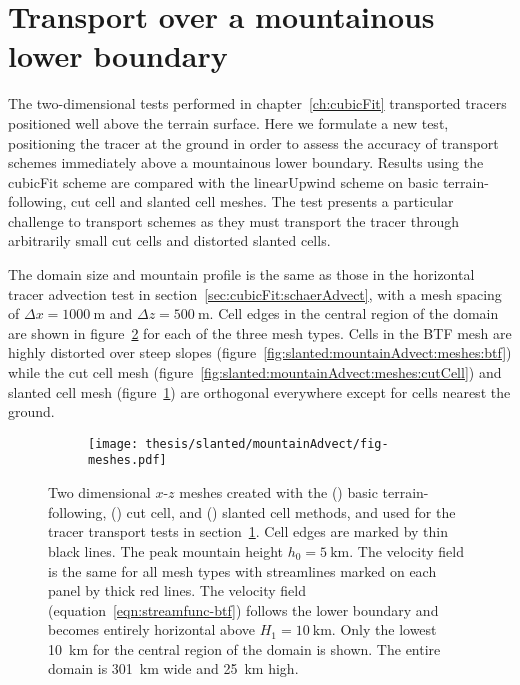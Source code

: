 \section{Transport over a mountainous lower boundary}
\label{sec:slanted:mountainAdvect}

The two-dimensional tests performed in chapter~\ref{ch:cubicFit} transported tracers positioned well above the terrain surface.  Here we formulate a new test, positioning the tracer at the ground in order to assess the accuracy of transport schemes immediately above a mountainous lower boundary.  Results using the cubicFit scheme are compared with the linearUpwind scheme on basic terrain-following, cut cell and slanted cell meshes.
The test presents a particular challenge to transport schemes as they must transport the tracer through arbitrarily small cut cells and distorted slanted cells.

The domain size and mountain profile is the same as those in the horizontal tracer advection test in section~\ref{sec:cubicFit:schaerAdvect}, with a mesh spacing of $\Delta x = \SI{1000}{\meter}$ and $\Delta z = \SI{500}{\meter}$.
Cell edges in the central region of the domain are shown in figure~\ref{fig:slanted:mountainAdvect:meshes} for each of the three mesh types.
Cells in the BTF mesh are highly distorted over steep slopes (figure~\ref{fig:slanted:mountainAdvect:meshes:btf}) while the cut cell mesh (figure~\ref{fig:slanted:mountainAdvect:meshes:cutCell}) and slanted cell mesh (figure~\ref{fig:slanted:mountainAdvect:meshes:slantedCell}) are orthogonal everywhere except for cells nearest the ground.

\begin{figure}
	\centering
	\begin{subfigure}{\textwidth}
		\label{fig:slanted:mountainAdvect:meshes:btf}
		\label{fig:slanted:mountainAdvect:meshes:cutCell}
		\label{fig:slanted:mountainAdvect:meshes:slantedCell}
		\texttt{[image: thesis/slanted/mountainAdvect/fig-meshes.pdf]}
	\end{subfigure}
%
	\caption{Two dimensional $x$-$z$ meshes created with the () basic terrain-following,
	() cut cell, and
	() slanted cell methods, and used for the tracer transport tests in section~\ref{sec:slanted:mountainAdvect}.  Cell edges are marked by thin black lines.  The peak mountain height $h_0 = \SI{5}{\kilo\meter}$.
The velocity field is the same for all mesh types with streamlines marked on each panel by thick red lines.
The velocity field (equation~\ref{eqn:streamfunc-btf}) follows the lower boundary and becomes entirely horizontal above $H_1 = \SI{10}{\kilo\meter}$.
Only the lowest \SI{10}{\kilo\meter} for the central region of the domain is shown.  The entire domain is \SI{301}{\kilo\meter} wide and \SI{25}{\kilo\meter} high.}
	\label{fig:slanted:mountainAdvect:meshes}
\end{figure}

